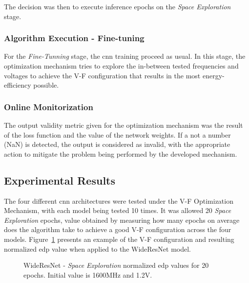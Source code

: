 The decision was then to execute inference epochs on the \textit{Space Exploration} stage.


\subsubsection{Algorithm Execution - Fine-tuning}

For the \textit{Fine-Tunning} stage, the \acrshort{cnn} training proceed as usual. In this stage, the optimization mechanism tries to explore the in-between tested frequencies and voltages to achieve the V-F configuration that results in the most energy-efficiency possible.  

\subsubsection{Online Monitorization}

The output validity metric given for the optimization mechanism was the result of the loss function and the value of the network weights. If a not a number (NaN) is detected, the output is considered as invalid, with the appropriate action to mitigate the problem being performed by the developed mechanism.



\subsection{Experimental Results}

The four different \acrshort{cnn} architectures were tested under the V-F Optimization Mechanism, with each model being tested 10 times. It was allowed 20 \textit{Space Exploration} epochs, value obtained by measuring how many epochs on average does the algorithm take to achieve a good V-F configuration across the four models. Figure~\ref{fig:3d} presents an example of the V-F configuration and resulting normalized \acrshort{edp} value when applied to the WideResNet model.

\begin{figure}[h]
\centering
    \caption{WideResNet - \textit{Space Exploration} normalized \acrshort{edp} values for 20 epochs. Initial value is 1600MHz and 1.2V.}
    \label{fig:3d}
\end{figure}


